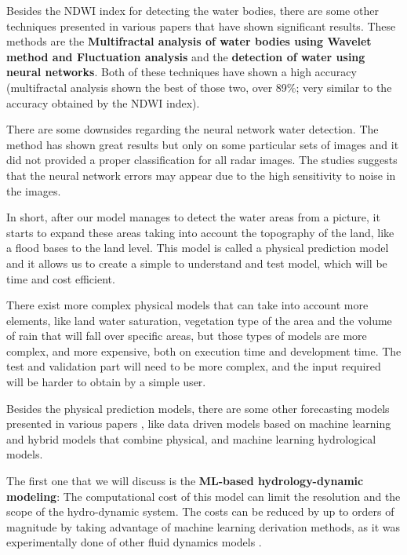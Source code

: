 \documentclass[12pt, a4paper]{report}
\begin{document}
Besides the NDWI index for detecting the water bodies, there are some other techniques presented in various papers \cite{Multifractal water analysis, NDWI Comparison} that have shown significant results. These methods are the \textbf{Multifractal analysis of water bodies using Wavelet method and Fluctuation analysis} and the \textbf{detection of water using neural networks}. Both of these techniques have shown a high accuracy (multifractal analysis shown the best of those two, over 89\%; very similar to the accuracy obtained by the NDWI index).
\par 
There are some downsides regarding the neural network water detection. The method has shown great results but only on some particular sets of images and it did not provided a proper classification for all radar images. The studies \cite{NDWI Comparison} suggests that the neural network errors may appear due to the high sensitivity to noise in the images. 
\par 

In short, after our model manages to detect the water areas from a picture, it starts to expand these areas taking into account the topography of the land, like a flood bases to the land level. This model is called a physical prediction model and it allows us to create a simple to understand and test model, which will be time and cost efficient. 
\par 

There exist more complex physical models that can take into account more elements, like land water saturation, vegetation type of the area and the volume of rain that will fall over specific areas, but those types of models are more complex, and more expensive, both on execution time and development time. The test and validation part will need to be more complex, and the input required will be harder to obtain by a simple user. 
\par 

Besides the physical prediction models, there are some other forecasting models presented in various papers \cite{Flood forecasting models}, like data driven models based on machine learning and hybrid models that combine physical, and machine learning hydrological models.\par 

The first one that we will discuss is the \textbf{ML-based hydrology-dynamic modeling}: The computational cost of this model can limit the resolution and the scope of the hydro-dynamic system. The costs can be reduced by up to orders of magnitude by taking advantage of machine learning derivation methods, as it was experimentally done of other fluid dynamics models \cite{Yohai}.
\par 
\end{document}
